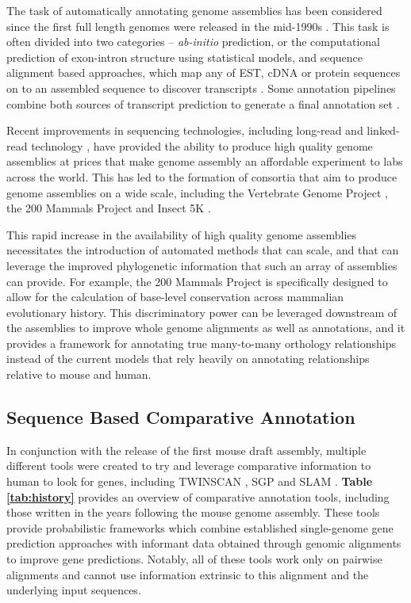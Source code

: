 \documentclass[fleqn,10pt]{wlscirep}
\begin{document}
The task of automatically annotating genome assemblies has been considered since the first full length genomes were released in the mid-1990s \cite{letovsky1998gdb,lukashin1998genemark,haussler1996generalized}. This task is often divided into two categories -- \textit{ab-initio} prediction, or the computational prediction of exon-intron structure using statistical models, and sequence alignment based approaches, which map any of EST, cDNA or protein sequences on to an assembled sequence to discover transcripts \cite{Aken01012016}. Some annotation pipelines combine both sources of transcript prediction to generate a final annotation set \cite{pruitt2006ncbi,cantarel2008maker}.

Recent improvements in sequencing technologies, including long-read \cite{gordon2016long} and linked-read technology \cite{10xassembly}, have provided the ability to produce high quality genome assemblies at prices that make genome assembly an affordable experiment to labs across the world. This has led to the formation of consortia that aim to produce genome assemblies on a wide scale, including the Vertebrate Genome Project \cite{haussler2009genome}, the 200 Mammals Project and Insect 5K \cite{robinson2011creating}.

This rapid increase in the availability of high quality genome assemblies necessitates the introduction of automated methods that can scale, and that can leverage the improved phylogenetic information that such an array of assemblies can provide. For example, the 200 Mammals Project is specifically designed to allow for the calculation of base-level conservation across mammalian evolutionary history. This discriminatory power can be leveraged downstream of the assemblies to improve whole genome alignments as well as annotations, and it provides a framework for annotating true many-to-many orthology relationships instead of the current models that rely heavily on annotating relationships relative to mouse and human.

\subsection{Sequence Based Comparative Annotation}

In conjunction with the release of the first mouse draft assembly\cite{waterston2002initial}, multiple different tools were created to try and leverage comparative information to human to look for genes, including TWINSCAN \cite{flicek2003leveraging}, SGP \cite{wiehe2001sgp} and SLAM \cite{alexandersson2003slam}. \textbf{Table \ref{tab:history}} provides an overview of comparative annotation tools, including those written in the years following the mouse genome assembly. These tools provide probabilistic frameworks which combine established single-genome gene prediction approaches \cite{yeh2001computational,gelfand1996gene} with informant data obtained through genomic alignments to improve gene predictions. Notably, all of these tools work only on pairwise alignments and cannot use information extrinsic to this alignment and the underlying input sequences.
\end{document}

